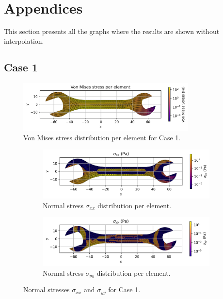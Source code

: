 \section{Appendices}

This section presents all the graphs where the results are shown without interpolation.

\subsection{Case 1}

\begin{figure}[H]
    \centering
    \includegraphics[width=0.8\textwidth]{GRAFICOS/Case b_von_mises_per_element.png}
    \caption{Von Mises stress distribution per element for Case 1.}
    \label{fig:von_mises_b}
\end{figure}

\begin{figure}[H]
    \centering
    \begin{subfigure}[t]{0.49\textwidth}
      \centering
      \includegraphics[width=\textwidth]{GRAFICOS/Case b - sigma_xx_per_element.png}
      \caption{Normal stress $\sigma_{xx}$ distribution per element.}
      \label{fig:sigma_xx_b}
    \end{subfigure}
    \hfill
    \begin{subfigure}[t]{0.49\textwidth}
      \centering
      \includegraphics[width=\textwidth]{GRAFICOS/Case b - sigma_yy_per_element.png}
      \caption{Normal stress $\sigma_{yy}$ distribution per element.}
      \label{fig:sigma_yy_b}
    \end{subfigure}
    \caption{Normal stresses $\sigma_{xx}$ and $\sigma_{yy}$ for Case 1.}
    \label{fig:normal_stresses_b}
\end{figure}

